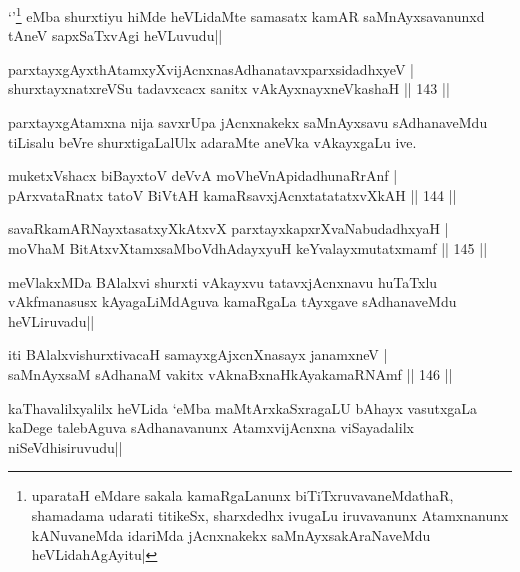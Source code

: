 \begin{artha}
`\stext '\footnote[1]{uparataH eMdare sakala kamaRgaLanunx biTiTxruvavaneMdathaR, shamadama udarati titikeSx, sharxdedhx ivugaLu iruvavanunx Atamxnanunx kANuvaneMda idariMda jAcnxnakekx saMnAyxsakAraNaveMdu heVLidahAgAyitu|} eMba shurxtiyu hiMde heVLidaMte samasatx kamAR saMnAyxsavanunxd tAneV sapxSaTxvAgi heVLuvudu||
\end{artha}

\begin{shl}
parxtayxgAyxthAtamxyXvijAcnxnasAdhanatavxparxsidadhxyeV |\\
shurxtayxnatxreVSu tadavxcacx sanitx vAkAyxnayxneVkashaH \hfill || 143 ||
\end{shl}	

\begin{artha}
parxtayxgAtamxna nija savxrUpa jAcnxnakekx saMnAyxsavu sAdhanaveMdu tiLisalu beVre shurxtigaLalUlx adaraMte aneVka vAkayxgaLu ive. 
\end{artha}


\begin{shl}
muketxVshacx biBayxtoV deVvA moVheVnApidadhunaRrAnf |\\
pArxvataRnatx tatoV BiVtAH kamaRsavxjAcnxtatatatxvXkAH \hfill || 144 ||
\end{shl}

\begin{shl}
savaRkamARNayxtasatxyXkAtxvX parxtayxkapxrXvaNabudadhxyaH |\\
moVhaM BitAtxvX\s \s tamxsaMboVdhAdayxyuH keYvalayxmutatxmamf \hfill || 145 ||
\end{shl}

\begin{artha}%
meVlakxMDa BAlalxvi shurxti vAkayxvu tatavxjAcnxnavu huTaTxlu vAkfmanasusx kAyagaLiMdAguva kamaRgaLa tAyxgave sAdhanaveMdu heVLiruvadu||
\end{artha}


\begin{shl}
iti BAlalxvishurxtivacaH samayxgAjxcnXnasayx janamxneV |\\
saMnAyxsaM sAdhanaM vakitx vAknaBxnaHkAyakamaRNAmf \hfill || 146 ||
\end{shl}

\begin{artha}
kaThavalilxyalilx heVLida `\stext eMba maMtArxkaSxragaLU bAhayx vasutxgaLa kaDege talebAguva sAdhanavanunx AtamxvijAcnxna viSayadalilx niSeVdhisiruvudu||
\end{artha}

